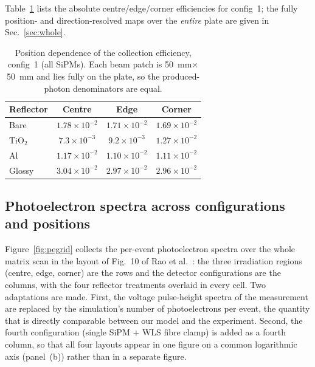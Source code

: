\documentclass[11pt,a4paper]{article}
\begin{document}
Table~\ref{tab:positions} lists the absolute centre/edge/corner efficiencies for
config~1; the fully position- and direction-resolved maps over the \emph{entire}
plate are given in Sec.~\ref{sec:whole}.

\begin{table}[H]
\centering
\caption{Position dependence of the collection efficiency, config~1 (all
SiPMs). Each beam patch is \SI{50}{\milli\meter}$\times$\SI{50}{\milli\meter}
and lies fully on the plate, so the produced-photon denominators are equal.}
\label{tab:positions}
\small
\begin{tabular}{@{}lccc@{}}
\toprule
Reflector & Centre & Edge & Corner \\
\midrule
Bare   & $1.78\times10^{-2}$ & $1.71\times10^{-2}$ & $1.69\times10^{-2}$ \\
TiO$_2$& $7.3\times10^{-3}$ & $9.2\times10^{-3}$ & $1.27\times10^{-2}$ \\
Al     & $1.17\times10^{-2}$ & $1.10\times10^{-2}$ & $1.11\times10^{-2}$ \\
Glossy & $3.04\times10^{-2}$ & $2.97\times10^{-2}$ & $2.96\times10^{-2}$ \\
\bottomrule
\end{tabular}
\end{table}

\subsection{Photoelectron spectra across configurations and positions}
\label{sec:pegrid}

Figure~\ref{fig:pegrid} collects the per-event photoelectron spectra over the
whole matrix scan in the layout of Fig.~10 of Rao et al.~\cite{Rao2025}: the
three irradiation regions (centre, edge, corner) are the rows and the detector
configurations are the columns, with the four reflector treatments overlaid in
every cell. Two adaptations are made. First, the voltage pulse-height spectra of
the measurement are replaced by the simulation's number of photoelectrons per
event, the quantity that is directly comparable between our model and the
experiment. Second, the fourth configuration (single SiPM $+$ WLS fibre clamp)
is added as a fourth column, so that all four layouts appear in one figure on a
common logarithmic axis (panel~(b)) rather than in a separate figure.
\end{document}
